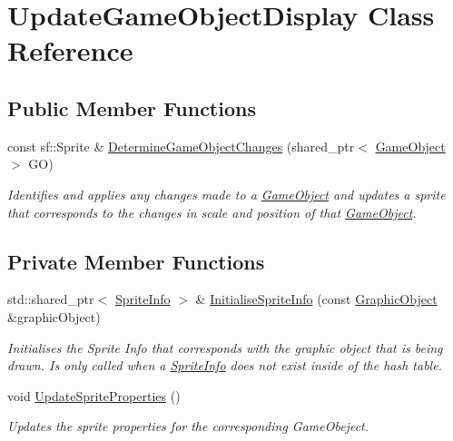 \hypertarget{class_update_game_object_display}{}\section{Update\+Game\+Object\+Display Class Reference}
\label{class_update_game_object_display}
\subsection*{Public Member Functions}
\begin{DoxyCompactItemize}
\item 
const sf\+::\+Sprite \& \hyperlink{class_update_game_object_display_a8aa216f92b1b31dbb0d9e1746b2f4105}{Determine\+Game\+Object\+Changes} (shared\+\_\+ptr$<$ \hyperlink{class_game_object}{Game\+Object} $>$ GO)
\begin{DoxyCompactList}\small\item\em Identifies and applies any changes made to a \hyperlink{class_game_object}{Game\+Object} and updates a sprite that corresponds to the changes in scale and position of that \hyperlink{class_game_object}{Game\+Object}. \end{DoxyCompactList}\end{DoxyCompactItemize}
\subsection*{Private Member Functions}
\begin{DoxyCompactItemize}
\item 
std\+::shared\+\_\+ptr$<$ \hyperlink{struct_sprite_info}{Sprite\+Info} $>$ \& \hyperlink{class_update_game_object_display_ae91b04b801fbb1e8b8bee6d4ee31296a}{Initialise\+Sprite\+Info} (const \hyperlink{class_graphic_object}{Graphic\+Object} \&graphic\+Object)
\begin{DoxyCompactList}\small\item\em Initialises the Sprite Info that corresponds with the graphic object that is being drawn. Is only called when a \hyperlink{struct_sprite_info}{Sprite\+Info} does not exist inside of the hash table. \end{DoxyCompactList}\item 
\mbox{\label{class_update_game_object_display_ad665d40d1ff70db62b23d8b34ea6287c}} 
void \hyperlink{class_update_game_object_display_ad665d40d1ff70db62b23d8b34ea6287c}{Update\+Sprite\+Properties} ()
\begin{DoxyCompactList}\small\item\em Updates the sprite properties for the corresponding Game\+Obeject. \end{DoxyCompactList}\end{DoxyCompactItemize}
